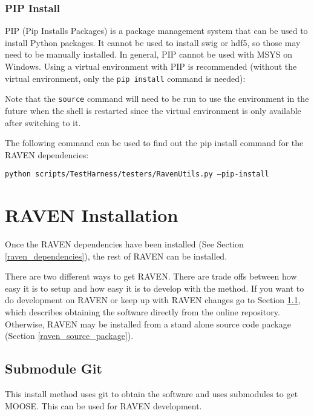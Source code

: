 \goToRavenInstallation

\subsubsection{PIP Install}


PIP (Pip Installs Packages) is a package management system that can be
used to install Python packages.  It cannot be used to install swig or
hdf5, so those may need to be manually installed.  In general, PIP
cannot be used with MSYS on Windows.  Using a virtual environment with
PIP is recommended (without the virtual environment, only the
\texttt{pip install} command is needed):



Note that the \texttt{source} command will need to be run to use the
environment in the future when the shell is restarted since the
virtual environment is only available after switching to it.

The following command can be used to find out the pip install command
for the RAVEN dependencies:

\texttt{python scripts/TestHarness/testers/RavenUtils.py --pip-install}

\goToRavenInstallation


\section{RAVEN Installation}
\label{raven_installation}

Once the RAVEN dependencies have been installed (See Section
\ref{raven_dependencies}), the rest of RAVEN can be installed.

There are two different ways to get RAVEN.  There are trade offs
between how easy it is to setup and how easy it is to develop with the
method.  If you want to do development on RAVEN or keep up with RAVEN
changes go to Section \ref{submodule_git}, which describes obtaining
the software directly from the online repository.  Otherwise, RAVEN
may be installed from a stand alone source code package (Section
\ref{raven_source_package}).


\subsection{Submodule Git}
\label{submodule_git}

This install method uses git to obtain the software and uses
submodules to get MOOSE.  This can be used for RAVEN development.

